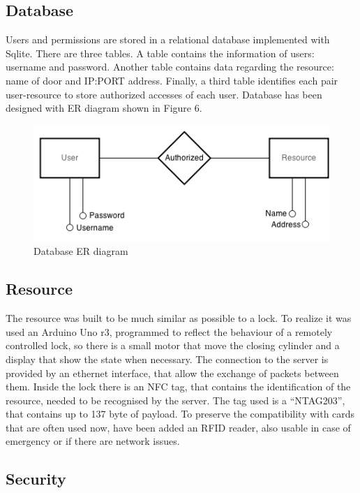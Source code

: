 \documentclass[conference]{IEEEtran}
\begin{document}
\subsection{Database}

Users and permissions are stored in a relational database implemented with Sqlite. There are three tables. A table contains the information of users: username and password. Another table contains data regarding the resource: name of door and IP:PORT address.
Finally, a third table identifies each pair user-resource to store authorized accesses of each user.
Database has been designed with ER diagram shown in Figure 6.

\begin{figure}[h]
\centering
\includegraphics[scale=0.5]{fig6}
\caption{Database ER diagram}
\label{fig_sim}
\end{figure}

\subsection{Resource}

The resource was built to be much similar as possible to a lock. To realize it was used an Arduino Uno r3, programmed to reflect the behaviour of a remotely controlled lock, so there is a small motor that move the closing cylinder and a display that show the state when necessary.
The connection to the server is provided by an ethernet interface, that allow the exchange of packets between them. 
Inside the lock there is an NFC tag, that contains the identification of the resource, needed to be recognised by the server. The tag used is a “NTAG203”, that contains up to 137 byte of payload.
To preserve the compatibility with cards that are often used now, have been added an RFID reader, also usable in case of emergency or if there are network issues.

\subsection{Security}
\end{document}
